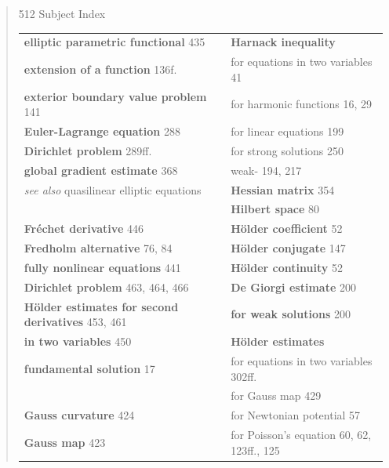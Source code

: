 \begin{quote}
512 \hfill Subject Index

\vspace{1em}

\begin{tabular}{@{}p{}p{}@{}}
\textbf{elliptic parametric functional} \hfill 435 &
\textbf{Harnack inequality} \\
\textbf{extension of a function} \hfill 136f. &
\quad for equations in two variables \hfill 41 \\
\textbf{exterior boundary value problem} \hfill 141 &
\quad for harmonic functions \hfill 16, 29 \\
\textbf{Euler-Lagrange equation} \hfill 288 &
\quad for linear equations \hfill 199 \\
\quad \textbf{Dirichlet problem} \hfill 289ff. &
\quad for strong solutions \hfill 250 \\
\quad \textbf{global gradient estimate} \hfill 368 &
\quad weak- \hfill 194, 217 \\
\quad \emph{see also} quasilinear elliptic equations &
\textbf{Hessian matrix} \hfill 354 \\
&
\textbf{Hilbert space} \hfill 80 \\
\textbf{Fréchet derivative} \hfill 446 &
\textbf{Hölder coefficient} \hfill 52 \\
\textbf{Fredholm alternative} \hfill 76, 84 &
\textbf{Hölder conjugate} \hfill 147 \\
\textbf{fully nonlinear equations} \hfill 441 &
\textbf{Hölder continuity} \hfill 52 \\
\quad \textbf{Dirichlet problem} \hfill 463, 464, 466 &
\quad \textbf{De Giorgi estimate} \hfill 200 \\
\quad \textbf{Hölder estimates for second derivatives} \hfill 453, 461 &
\quad \textbf{for weak solutions} \hfill 200 \\
\quad \textbf{in two variables} \hfill 450 &
\textbf{Hölder estimates} \\
\textbf{fundamental solution} \hfill 17 &
\quad for equations in two variables \hfill 302ff. \\
&
\quad for Gauss map \hfill 429 \\
\textbf{Gauss curvature} \hfill 424 &
\quad for Newtonian potential \hfill 57 \\
\textbf{Gauss map} \hfill 423 &
\quad for Poisson's equation \hfill 60, 62, 123ff., 125 \\

\end{tabular}
\end{quote}
